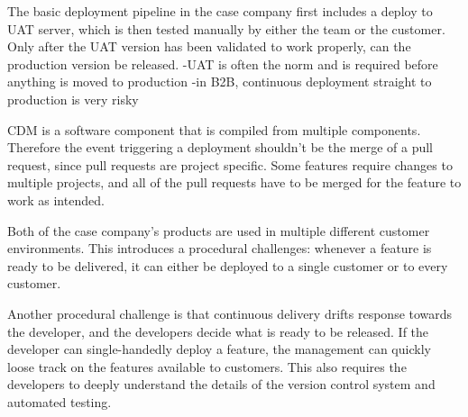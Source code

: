 \documentclass[english]{tktltiki2}
\theoremstyle{definition}
\theoremstyle{remark}
\begin{document}
The basic deployment pipeline in the case company first includes a deploy to UAT server, which is then tested manually by either the team or the customer. Only after the UAT version has been validated to work properly, can the production version be released. 
-UAT is often the norm and is required before anything is moved to production
-in B2B, continuous deployment straight to production is very risky

CDM is a software component that is compiled from multiple components. Therefore the event triggering a deployment shouldn't be the merge of a pull request, since pull requests are project specific. Some features require changes to multiple projects, and all of the pull requests have to be merged for the feature to work as intended. 

Both of the case company's products are used in multiple different customer environments. This introduces a procedural challenges: whenever a feature is ready to be delivered, it can either be deployed to a single customer or to every customer.



Another procedural challenge is that continuous delivery drifts response towards the developer, and the developers decide what is ready to be released. If the developer can single-handedly deploy a feature, the management can quickly loose track on the features available to customers. This also requires the developers to deeply understand the details of the version control system and automated testing. 
\end{document}
